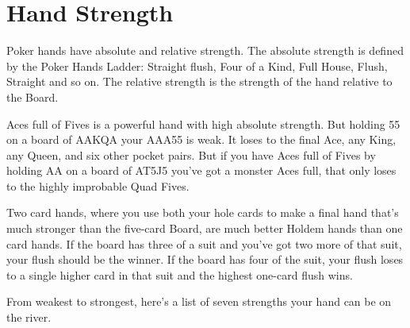 \chapter{Hand Strength}


Poker hands have absolute and relative strength.
The absolute strength is defined by the Poker Hands Ladder:
Straight flush, Four of a Kind, Full House, Flush, Straight
and so on. The relative strength is the strength of the
hand relative to the Board.

Aces full of Fives is a powerful hand with high absolute strength.
But holding 55 on a board of AAKQA your AAA55 is weak. It loses
to the final Ace, any King, any Queen, and six other pocket pairs.
But if you have Aces full of Fives by holding AA on a board of AT5J5
you've got a monster Aces full, that only loses to the highly
improbable Quad Fives.

Two card hands, where you use both your hole cards to make a final
hand that's much stronger than the five-card Board, are much
better Holdem hands than one card hands. If the board has
three of a suit and you've got two more of that suit, your flush
should be the winner. If the board has four of the suit, your
flush loses to a single higher card in that suit and the highest
one-card flush wins.

From weakest to strongest, here's a list of seven strengths your hand
can be on the river.

